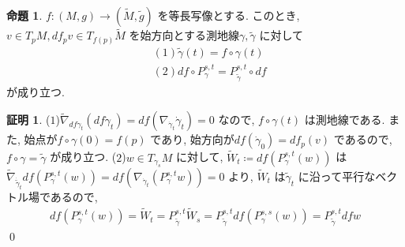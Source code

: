 \documentclass[10pt, fleqn, label-section=none]{bxjsarticle}
\theoremstyle{definition}
\newtheorem{prop}[dfn]{命題}
\newtheorem*{pf*}{証明}
\begin{document}
\begin{prop}
$f: (M,g) \rightarrow (\tilde M, \tilde g)$ を等長写像とする. このとき, $v \in T_pM, df_p v \in T_{f(p)} \tilde M$ を始方向とする測地線$\gamma, \tilde \gamma$ に対して
\begin{align*} &(1) \tilde \gamma (t) = f \circ \gamma (t) \\&(2)df\circ P_{\gamma}^{s,t} = P_{\tilde \gamma}^{s,t}\circ df \end{align*}
が成り立つ.
\end{prop}
\begin{pf*}
($1$)$\tilde \nabla_{df \dot \gamma_t} (df \dot \gamma_t) = df (\nabla_{\dot \gamma_t} \dot \gamma_t) = 0$ なので, $f\circ \gamma (t) $ は測地線である. また, 始点が$f \circ \gamma (0) = f(p)$ であり, 始方向が$df(\dot \gamma_0) = df_p (v)$ であるので, $f\circ \gamma = \tilde \gamma$ が成り立つ. ($2$)$w \in T_{\gamma_s} M$ に対して, $\tilde W _t \coloneqq df(P_{\gamma}^{s,t}(w))$ は$\tilde \nabla_{\dot{\tilde \gamma}_t} df(P_{\gamma}^{s,t}(w)) = df(\nabla_{\dot \gamma_t} (P_{\gamma}^{s,t} w)) = 0$ より, $\tilde W_t$ は$\tilde \gamma_t$ に沿って平行なベクトル場であるので, 
\begin{align*}df(P_{\gamma}^{s,t}(w)) =  \tilde W_t = P_{\tilde \gamma}^{s,t} \tilde W_s  = P_{\tilde \gamma}^{s,t} df(P_{\gamma}^{s,s}(w)) = P_{\tilde \gamma}^{s,t} dfw \end{align*} 
\qed
\end{pf*}
\end{document}
